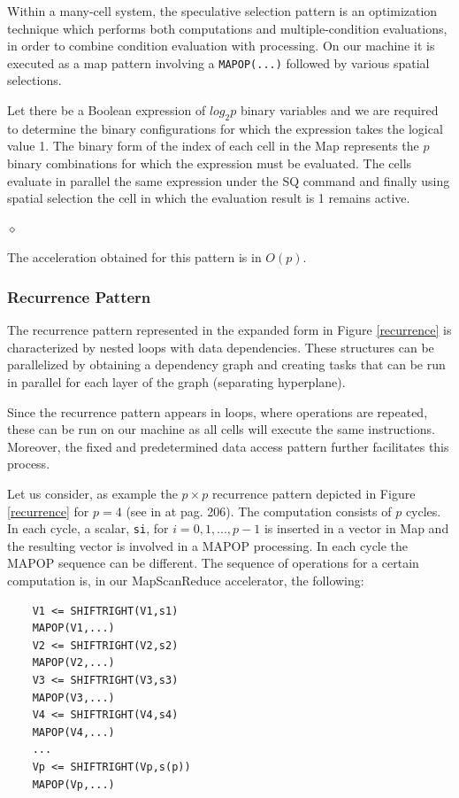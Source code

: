 Within a many-cell system, the speculative selection pattern is an optimization technique which  performs both computations and multiple-condition evaluations, in order to combine condition evaluation with processing. On our machine it is executed as a map pattern involving a {\tt MAPOP(...)} followed by various spatial selections.

\begin{exemplu}
Let there be a Boolean expression of $log_2 p$ binary variables and we are required to determine the binary configurations for which the expression takes the logical value 1. The binary form of the index of each cell in the Map represents the $p$ binary combinations for which the expression must be evaluated. The cells evaluate in parallel the same expression under the SQ command and finally using spatial selection the cell in which the evaluation result is 1 remains active.

$\diamond$
\end{exemplu}

The acceleration obtained for this  pattern is in $O(p)$.

\subsubsection{Recurrence Pattern}

The recurrence pattern represented in the expanded form   in  Figure \ref{recurrence} is characterized by nested loops with data dependencies. These structures can be parallelized by obtaining a dependency graph and creating tasks that can be run in parallel for each layer of the graph (separating hyperplane).


Since the recurrence pattern appears in loops, where operations are repeated, these can be run on our machine as all cells will execute the same instructions. Moreover, the fixed and predetermined data access pattern further facilitates this process.

Let us consider, as example the $p \times p$ recurrence pattern depicted in Figure \ref{recurrence} for $p=4$ (see in \cite{McCool12} at pag. 206). The computation consists of $p$ cycles. In each cycle, a scalar, {\tt si}, for $i = 0,1,...,p-1$ is inserted in a vector in  Map and the resulting vector is involved in a MAPOP processing. In each cycle the MAPOP sequence can be different. The sequence of operations for a certain computation is, in our MapScanReduce accelerator, the following:
\begin{verbatim}
    V1 <= SHIFTRIGHT(V1,s1)
    MAPOP(V1,...)
    V2 <= SHIFTRIGHT(V2,s2)
    MAPOP(V2,...)
    V3 <= SHIFTRIGHT(V3,s3)
    MAPOP(V3,...)
    V4 <= SHIFTRIGHT(V4,s4)
    MAPOP(V4,...)
    ...
    Vp <= SHIFTRIGHT(Vp,s(p))
    MAPOP(Vp,...)
\end{verbatim}

